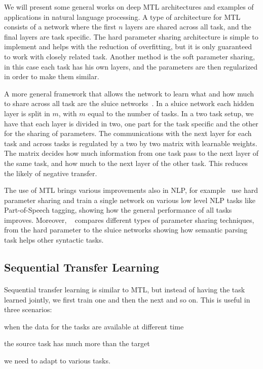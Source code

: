 We will present some general works on deep MTL architectures and examples of applications in natural language processing. A type of architecture for MTL consists of a network where the first $n$ layers are shared across all task, and the final layers are task specific. The hard parameter sharing architecture is simple to implement and helps with the reduction of overfitting, but it is only guaranteed to work with closely related task. Another method is the soft parameter sharing, in this case each task has his own layers, and the parameters are then regularized in order to make them similar. 

A more general framework that allows the network to learn what and how much to share across all task are the sluice networks~\citep{ruder2017sluice}. In a sluice network each hidden layer is split in $m$, with $m$ equal to the number of tasks. In a two task setup, we have that each layer is divided in two, one part for the task specific and the other for the sharing of parameters. The communications with the next layer for each task and across tasks is regulated by a two by two matrix with learnable weights. The matrix decides how much information from one task pass to the next layer of the same task, and how much to the next layer of the other task. This reduces the likely of negative transfer.

The use of MTL brings various improvements also in NLP, for example~\cite{collobert2008a} use hard parameter sharing and train a single network on various low level NLP tasks like Part-of-Speech tagging, showing how the general performance of all tasks improves. Moreover, ~\cite{abdou2018semanticmtl} compares different types of parameter sharing techniques, from the hard parameter to the sluice networks showing how semantic parsing task helps other syntactic tasks.


\subsection{Sequential Transfer Learning}
\paragraph{}
Sequential transfer learning is similar to MTL, but instead of having the task learned jointly, we first train one and then the next and so on. This is useful in three scenarios: \begin{enumerate*}[a)]
  \item when the data for the tasks are available at different time
  \item the source task has much more than the target
  \item we need to adapt to various tasks.
\end{enumerate*}

